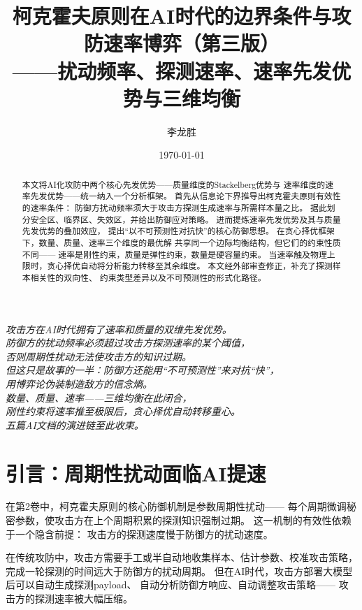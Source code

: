 \documentclass[11pt,a4paper]{article}
\title{柯克霍夫原则在AI时代的边界条件与攻防速率博弈（第三版）\\
——扰动频率、探测速率、速率先发优势与三维均衡}
\author{李龙胜}
\date{\today}
\begin{document}
\maketitle

\begin{center}
\textit{
攻击方在AI时代拥有了速率和质量的双维先发优势。\\
防御方的扰动频率必须超过攻击方探测速率的某个阈值，\\
否则周期性扰动无法使攻击方的知识过期。\\
但这只是故事的一半：防御方还能用“不可预测性”来对抗“快”，\\
用博弈论伪装制造敌方的信念熵。\\
数量、质量、速率——三维均衡在此闭合，\\
刚性约束将速率推至极限后，贪心择优自动转移重心。\\
五篇AI文档的演进链至此收束。
}
\end{center}

\vspace{5mm}

\begin{abstract}
本文将AI化攻防中两个核心先发优势——质量维度的Stackelberg优势与
速率维度的速率先发优势——统一纳入一个分析框架。
首先从信息论下界推导出柯克霍夫原则有效性的速率条件：
防御方扰动频率须大于攻击方探测生成速率与所需样本量之比。
据此划分安全区、临界区、失效区，并给出防御应对策略。
进而提炼速率先发优势及其与质量先发优势的叠加效应，
提出“以不可预测性对抗快”的核心防御思想。
在贪心择优框架下，数量、质量、速率三个维度的最优解
共享同一个边际均衡结构，但它们的约束性质不同——
速率是刚性约束，质量是弹性约束，数量是硬容量约束。
当速率触及物理上限时，贪心择优自动将分析能力转移至其余维度。
本文经外部审查修正，补充了探测样本相关性的双向性、
约束类型差异以及不可预测性的形式化路径。
\end{abstract}

\tableofcontents

\section{引言：周期性扰动面临AI提速}

在第2卷中，柯克霍夫原则的核心防御机制是参数周期性扰动——
每个周期微调秘密参数，使攻击方在上个周期积累的探测知识强制过期。
这一机制的有效性依赖于一个隐含前提：
攻击方的探测速度慢于防御方的扰动速度。

在传统攻防中，攻击方需要手工或半自动地收集样本、估计参数、校准攻击策略，
完成一轮探测的时间远大于防御方的扰动周期。
但在AI时代，攻击方部署大模型后可以自动生成探测payload、
自动分析防御方响应、自动调整攻击策略——
攻击方的探测速率被大幅压缩。
\end{document}
